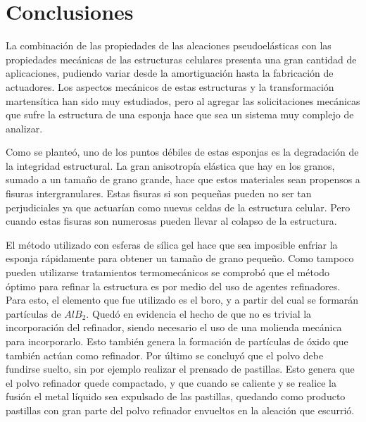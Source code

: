 \documentclass[a4paper,12pt,fleqn,twoside,openany]{book}
\begin{document}
 
 

 
 

 
 
\chapter{Conclusiones}
  
 
 La combinación de las propiedades de las aleaciones pseudoelásticas con las propiedades mecánicas de las estructuras celulares presenta una gran cantidad de aplicaciones, pudiendo variar desde la amortiguación hasta la fabricación de actuadores. Los aspectos mecánicos de estas estructuras y la transformación martensítica han sido muy estudiados, pero al agregar las solicitaciones mecánicas que sufre la estructura de una esponja hace que sea un sistema muy complejo de analizar.
 
 Como se planteó, uno de los puntos débiles de estas esponjas es la degradación de la integridad estructural. La gran anisotropía elástica que hay en los granos, sumado a un tamaño de grano grande, hace que estos materiales sean propensos a fisuras intergranulares. Estas fisuras si son pequeñas pueden no ser tan perjudiciales ya que actuarían como nuevas celdas de la estructura celular. Pero cuando estas fisuras son numerosas pueden llevar al colapso de la estructura. 
 
 El método utilizado con esferas de sílica gel hace que sea imposible enfriar la esponja rápidamente para obtener un tamaño de grano pequeño. Como tampoco pueden utilizarse tratamientos termomecánicos se comprobó que el método óptimo para refinar la estructura es por medio del uso de agentes refinadores. Para esto, el elemento que fue utilizado es el boro, y a partir del cual se formarán partículas de $AlB_2$. Quedó en evidencia el hecho de que no es trivial la incorporación del refinador, siendo necesario el uso de una molienda mecánica para incorporarlo. Esto también genera la formación de partículas de óxido que también actúan como refinador. Por último se concluyó que el polvo debe fundirse suelto, sin por ejemplo realizar el prensado de pastillas. Esto genera que el polvo refinador quede compactado, y que cuando se caliente y se realice la fusión el metal líquido sea expulsado de las pastillas, quedando como producto pastillas con gran parte del polvo refinador envueltos en la aleación que escurrió.
 
\end{document}
